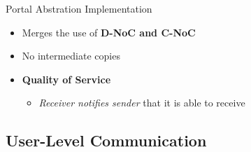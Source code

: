 		\begin{frame}[fragile]{Portal Abstration Implementation}
			\begin{itemize}
				\item Merges the use of \textbf{D-NoC and C-NoC}
				\item No intermediate copies
				\item \textbf{Quality of Service}
				\begin{itemize}
					\item \textit{Receiver notifies sender} that it is able to receive
				\end{itemize}
			\end{itemize}


		\end{frame}

	\subsection{User-Level Communication}

